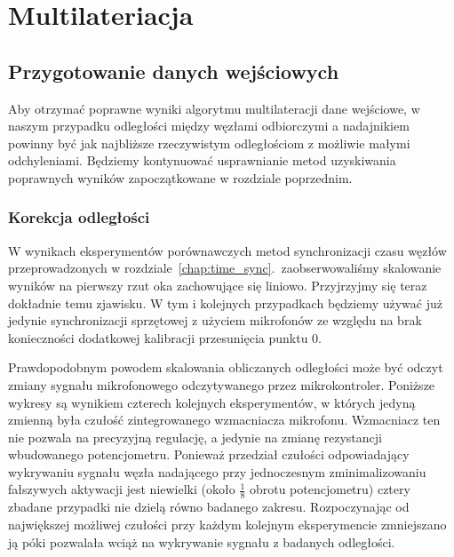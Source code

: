 \chapter{Multilateriacja}\label{chap:multilateration}

\section{Przygotowanie danych wejściowych}

Aby otrzymać poprawne wyniki algorytmu multilateracji dane wejściowe, w naszym przypadku odległości między węzłami odbiorczymi a nadajnikiem powinny być jak najbliższe rzeczywistym odległościom z możliwie małymi odchyleniami. Będziemy kontynuować usprawnianie metod uzyskiwania poprawnych wyników zapoczątkowane w rozdziale poprzednim.

\subsection{Korekcja odległości}

W wynikach eksperymentów porównawczych metod synchronizacji czasu węzłów przeprowadzonych w rozdziale~\ref{chap:time_sync}.\ zaobserwowaliśmy skalowanie wyników na pierwszy rzut oka zachowujące się liniowo. Przyjrzyjmy się teraz dokładnie temu zjawisku. W tym i kolejnych przypadkach będziemy używać już jedynie synchronizacji sprzętowej z użyciem mikrofonów ze względu na brak konieczności dodatkowej kalibracji przesunięcia punktu 0.

Prawdopodobnym powodem skalowania obliczanych odległości może być odczyt zmiany sygnału mikrofonowego odczytywanego przez mikrokontroler. Poniższe wykresy są wynikiem czterech kolejnych eksperymentów, w których jedyną zmienną była czułość zintegrowanego wzmacniacza mikrofonu. Wzmacniacz ten nie pozwala na precyzyjną regulację, a jedynie na zmianę rezystancji wbudowanego potencjometru. Ponieważ przedział czułości odpowiadający wykrywaniu sygnału węzła nadającego przy jednoczesnym zminimalizowaniu fałszywych aktywacji jest niewielki (około $\frac{1}{8}$ obrotu potencjometru) cztery zbadane przypadki nie dzielą równo badanego zakresu. Rozpoczynając od największej możliwej czułości przy każdym kolejnym eksperymencie zmniejszano ją póki pozwalała wciąż na wykrywanie sygnału z badanych odległości.


